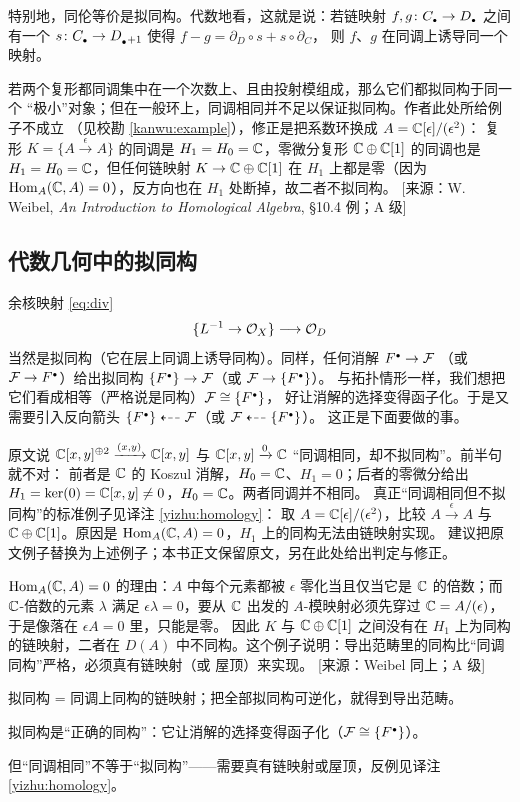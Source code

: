 特别地，同伦等价是拟同构。代数地看，这就是说：若链映射 $f,g\colon C_{\scriptscriptstyle\bullet}\to D_{\scriptscriptstyle\bullet}$
之间有一个 $s\colon C_{\scriptscriptstyle\bullet}\to D_{_{\scriptscriptstyle\bullet}+1}$ 使得 $f-g=\partial_D\circ s+s\circ\partial_C$，
则 $f$、$g$ 在同调上诱导同一个映射。

\begin{yizhu}
若两个复形都同调集中在一个次数上、且由投射模组成，那么它们都拟同构于同一个
“极小”对象；但在一般环上，同调相同并不足以保证拟同构。作者此处所给例子不成立
（见校勘 \ref{kanwu:example}），修正是把系数环换成 $A=\mathbb{C}[\epsilon]/(\epsilon^2)$：
复形 $K=\{A\xrightarrow{\epsilon}A\}$ 的同调是 $H_1=H_0=\mathbb{C}$，零微分复形
$\mathbb{C}\oplus\mathbb{C}[1]$ 的同调也是 $H_1=H_0=\mathbb{C}$，但任何链映射 $K\to\mathbb{C}\oplus\mathbb{C}[1]$ 在
$H_1$ 上都是零（因为 $\operatorname{Hom}_A(\mathbb{C},A)=0$），反方向也在 $H_1$ 处断掉，故二者不拟同构。
[来源：W. Weibel, \textit{An Introduction to Homological Algebra}, §10.4 例；A 级]
\end{yizhu}

\subsection*{代数几何中的拟同构}

余核映射 \eqref{eq:div}
$$
\{L^{-1}\to\mathcal{O}_X\}\longrightarrow\mathcal{O}_D
$$
当然是拟同构（它在层上同调上诱导同构）。同样，任何消解 $F^{\scriptscriptstyle\bullet}\to\mathcal{F}$
（或 $\mathcal{F}\to F^{\scriptscriptstyle\bullet}$）给出拟同构 $\{F^{\scriptscriptstyle\bullet}\}\to\mathcal{F}$（或 $\mathcal{F}\to\{F^{\scriptscriptstyle\bullet}\}$）。
与拓扑情形一样，我们想把它们看成相等（严格说是同构）$\mathcal{F}\cong\{F^{\scriptscriptstyle\bullet}\}$，
好让消解的选择变得函子化。于是又需要引入反向箭头
$\{F^{\scriptscriptstyle\bullet}\}\dashleftarrow\mathcal{F}$（或 $\mathcal{F}\dashleftarrow\{F^{\scriptscriptstyle\bullet}\}$）。
这正是下面要做的事。

\begin{kanwu}\label{kanwu:example}
原文说 $\mathbb{C}[x,y]^{\oplus2}\xrightarrow{(x,y)}\mathbb{C}[x,y]$ 与
$\mathbb{C}[x,y]\xrightarrow{0}\mathbb{C}$ “同调相同，却不拟同构”。前半句就不对：
前者是 $\mathbb{C}$ 的 Koszul 消解，$H_0=\mathbb{C}$、$H_1=0$；后者的零微分给出
$H_1=\ker(0)=\mathbb{C}[x,y]\ne0$，$H_0=\mathbb{C}$。两者同调并不相同。
真正“同调相同但不拟同构”的标准例子见译注 \ref{yizhu:homology}：
取 $A=\mathbb{C}[\epsilon]/(\epsilon^2)$，比较 $A\xrightarrow{\epsilon}A$ 与
$\mathbb{C}\oplus\mathbb{C}[1]$。原因是 $\operatorname{Hom}_A(\mathbb{C},A)=0$，$H_1$ 上的同构无法由链映射实现。
建议把原文例子替换为上述例子；本书正文保留原文，另在此处给出判定与修正。
\end{kanwu}

\begin{yizhu}\label{yizhu:homology}
$\operatorname{Hom}_A(\mathbb{C},A)=0$ 的理由：$A$ 中每个元素都被 $\epsilon$ 零化当且仅当它是 $\mathbb{C}$
的倍数；而 $\mathbb{C}$-倍数的元素 $\lambda$ 满足 $\epsilon\lambda=0$，要从 $\mathbb{C}$ 出发的
$A$-模映射必须先穿过 $\mathbb{C}=A/(\epsilon)$，于是像落在 $\epsilon A=0$ 里，只能是零。
因此 $K$ 与 $\mathbb{C}\oplus\mathbb{C}[1]$ 之间没有在 $H_1$ 上为同构的链映射，二者在 $D(A)$
中不同构。这个例子说明：导出范畴里的同构比“同调同构”严格，必须真有链映射（或
屋顶）来实现。
[来源：Weibel 同上；A 级]
\end{yizhu}

\begin{keytakeaways}
\item 拟同构 = 同调上同构的链映射；把全部拟同构可逆化，就得到导出范畴。
\item 拟同构是“正确的同构”：它让消解的选择变得函子化（$\mathcal{F}\cong\{F^{\scriptscriptstyle\bullet}\}$）。
\item 但“同调相同”不等于“拟同构”——需要真有链映射或屋顶，反例见译注
  \ref{yizhu:homology}。
\end{keytakeaways}
